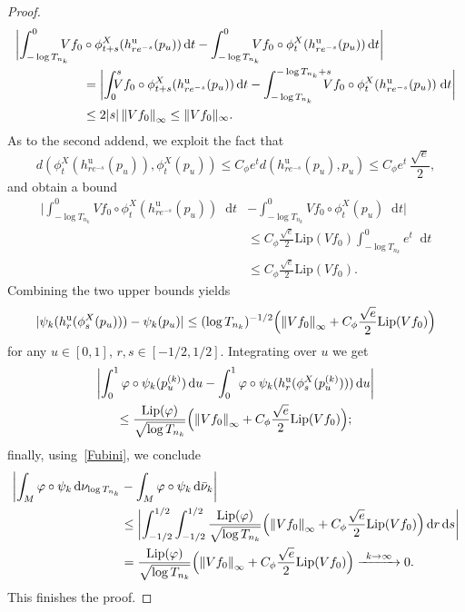 \documentclass[10pt]{amsart}
\newcommand\To[1]{\mathchoice{\xrightarrow{\kern4pt#1\kern3pt}}{\stackrel{#1}{\longrightarrow}}{}{}}
\newcommand{\nnorm}[1]{\lVert#1\rVert}
\newcommand*{\diff}{\mathop{}\!\mathrm{d}}
\newcommand{\norm}[1]{\left\lVert#1\right\rVert}
\theoremstyle{definition}
\begin{document}
\begin{appendix}
\begin{proof}
\begin{align*}
\biggl|\int_{-\log{T_{n_k}}}^{0}\hspace*{-3mm}Vf_0&\circ \phi^{X}_{t+s}(h^{\mathrm{u}}_{re^{-s}}(p_u))\diff t-\int_{-\log{T_{n_k}}}^{0}\hspace*{-3mm}Vf_0\circ \phi^{X}_{t}(h^{\mathrm{u}}_{re^{-s}}(p_u))\diff t\biggr|\\
&=
\biggl|\int_{0}^{s}\hspace*{-3mm}Vf_0\circ \phi^{X}_{t+s}(h^{\mathrm{u}}_{re^{-s}}(p_u))\diff t-\int_{-\log{T_{n_k}}}^{-\log{T_{n_k}}+s}\hspace*{-3mm}Vf_0\circ \phi^{X}_{t}(h^{\mathrm{u}}_{re^{-s}}(p_u))\;
\text{d}t\biggr|\\
&\leq 2|s|\norm{Vf_0}_{\infty}\leq \nnorm{Vf_0}_{\infty}.
\end{align*}
As to the second addend, we exploit the fact that
\begin{equation*}d(\phi^{X}_t(h^{\mathrm{u}}_{re^{-s}}(p_u)),\phi^{X}_t(p_u))\leq C_{\phi}e^{t}d(h^{\mathrm{u}}_{re^{-s}}(p_u),p_u)\leq C_{\phi}e^{t}\,\frac{\sqrt{e}}{2},
\end{equation*}
and obtain a bound
\begin{align*}
\biggl|\int_{-\log{T_{n_k}}}^{0}Vf_0\circ \phi^{X}_{t}(h^{\mathrm{u}}_{re^{-s}}(p_u))\diff t&-\int_{-\log{T_{n_k}}}^{0}Vf_0\circ \phi_t^{X}(p_u)\diff t\biggr|\\
&\leq C_{\phi}\frac{\sqrt{e}}{2}\text{Lip}(Vf_0)\int_{-\log{T_{n_k}}}^{0}e^{t}\diff t\\
&\leq C_{\phi}\frac{\sqrt{e}}{2}\text{Lip}(Vf_0).
\end{align*}
Combining the two upper bounds yields
\begin{equation*}
|\psi_k(h^{\mathrm{u}}_r(\phi^{X}_s(p_u)))-\psi_k(p_u)|\leq (\log{T_{n_k}})^{-1/2}\Bigl(\norm{Vf_0}_{\infty}+C_{\phi}\frac{\sqrt{e}}{2}\text{Lip}(Vf_0)\Bigr)
\end{equation*}
for any $u\in [0,1]$, $r,s\in [-1/2,1/2]$. Integrating over $u$ we get
\begin{multline*}
\biggl|\int_{0}^{1}\varphi\circ\psi_k(p_u^{(k)})\diff u-\int_{0}^{1}\varphi\circ\psi_k(h^{\mathrm{u}}_r(\phi^{X}_{s}(p_u^{(k)})))\diff u\biggr|\\
\leq \frac{\text{Lip}(\varphi)}{\sqrt{\log{T_{n_k}}}}\Bigl(\norm{Vf_0}_{\infty}+C_{\phi}\frac{\sqrt{e}}{2}\text{Lip}(Vf_0)\Bigr);
\end{multline*}
finally, using~\eqref{Fubini}, we conclude
\begin{align*}
\biggl|\int_{M}\varphi\circ \psi_k\diff \nu_{\log{T_{n_k}}}&-\int_{M}\varphi\circ \psi_k\diff \bar{\nu}_k \biggr|\\
&\leq\biggl|\int_{-1/2}^{1/2}\int_{-1/2}^{1/2}\frac{\text{Lip}(\varphi)}{\sqrt{\log{T_{n_k}}}} \Bigl(\norm{Vf_0}_{\infty}+C_{\phi}\frac{\sqrt{e}}{2}\text{Lip}(Vf_0) \Bigr)\diff r\diff s\biggr|\\
&= \frac{\text{Lip}(\varphi)}{\sqrt{\log{T_{n_k}}}}\Bigl(\norm{Vf_0}_{\infty}+C_{\phi}\frac{\sqrt{e}}{2}\text{Lip}(Vf_0)\Bigr)\To{k\to\infty}0.
\end{align*}
This finishes the proof.
\end{proof}

\end{appendix}
\end{document}
